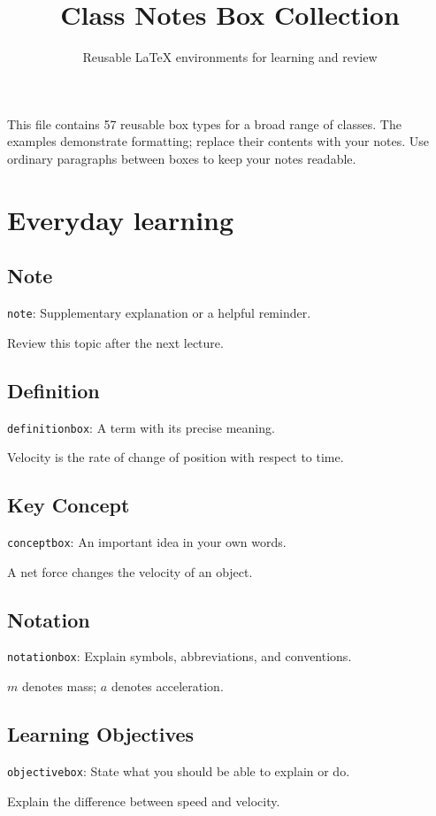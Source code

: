 \documentclass[11pt]{article}
\title{Class Notes Box Collection}
\author{Reusable LaTeX environments for learning and review}
\date{}
\begin{document}
\maketitle
This file contains 57 reusable box types for a broad range of classes.
The examples demonstrate formatting; replace their contents with your notes.
Use ordinary paragraphs between boxes to keep your notes readable.
\tableofcontents
\clearpage
\section{Everyday learning}
\subsection{Note}
{\small\texttt{note}: Supplementary explanation or a helpful reminder.}
\begin{note}
Review this topic after the next lecture.
\end{note}
\subsection{Definition}
{\small\texttt{definitionbox}: A term with its precise meaning.}
\begin{definitionbox}
Velocity is the rate of change of position with respect to time.
\end{definitionbox}
\subsection{Key Concept}
{\small\texttt{conceptbox}: An important idea in your own words.}
\begin{conceptbox}
A net force changes the velocity of an object.
\end{conceptbox}
\subsection{Notation}
{\small\texttt{notationbox}: Explain symbols, abbreviations, and conventions.}
\begin{notationbox}
$m$ denotes mass; $a$ denotes acceleration.
\end{notationbox}
\subsection{Learning Objectives}
{\small\texttt{objectivebox}: State what you should be able to explain or do.}
\begin{objectivebox}
Explain the difference between speed and velocity.
\end{objectivebox}
\end{document}
